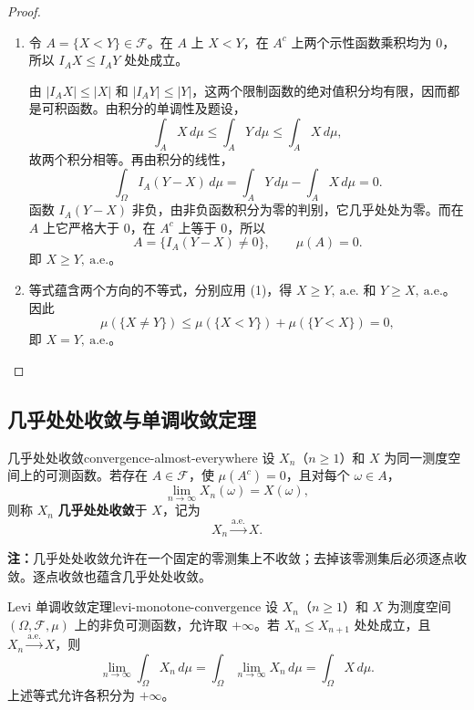 \begin{proof}
\begin{enumerate}
\item 令 $A=\{X<Y\}\in\mathcal F$。在 $A$ 上 $X<Y$，在 $A^c$ 上两个示性函数乘积均为 $0$，所以 $I_AX\leq I_AY$ 处处成立。

由 $|I_AX|\leq|X|$ 和 $|I_AY|\leq|Y|$，这两个限制函数的绝对值积分均有限，因而都是可积函数。由积分的单调性及题设，
\[
\int_A X\,d\mu\leq\int_A Y\,d\mu
\leq\int_A X\,d\mu,
\]
故两个积分相等。再由积分的线性，
\[
\int_\Omega I_A(Y-X)\,d\mu
=\int_A Y\,d\mu-\int_A X\,d\mu=0.
\]
函数 $I_A(Y-X)$ 非负，由非负函数积分为零的判别，它几乎处处为零。而在 $A$ 上它严格大于 $0$，在 $A^c$ 上等于 $0$，所以
\[
A=\{I_A(Y-X)\ne0\},\qquad\mu(A)=0.
\]
即 $X\geq Y,\ \mathrm{a.e.}$。
\item 等式蕴含两个方向的不等式，分别应用 (1)，得 $X\geq Y,\ \mathrm{a.e.}$ 和 $Y\geq X,\ \mathrm{a.e.}$。因此
\[
\mu(\{X\ne Y\})
\leq\mu(\{X<Y\})+\mu(\{Y<X\})=0,
\]
即 $X=Y,\ \mathrm{a.e.}$。
\end{enumerate}
\end{proof}

\subsection*{几乎处处收敛与单调收敛定理}

\begin{mydefinition}{几乎处处收敛}{convergence-almost-everywhere}
设 $X_n$（$n\geq1$）和 $X$ 为同一测度空间上的可测函数。若存在 $A\in\mathcal F$，使 $\mu(A^c)=0$，且对每个 $\omega\in A$，
\[
\lim_{n\to\infty}X_n(\omega)=X(\omega),
\]
则称 $X_n$ \textbf{几乎处处收敛}于 $X$，记为
\[
X_n\xrightarrow{\mathrm{a.e.}}X.
\]
\end{mydefinition}

\textbf{注：}\quad 几乎处处收敛允许在一个固定的零测集上不收敛；去掉该零测集后必须逐点收敛。逐点收敛也蕴含几乎处处收敛。

\begin{mytheorem}{Levi 单调收敛定理}{levi-monotone-convergence}
设 $X_n$（$n\geq1$）和 $X$ 为测度空间 $(\Omega,\mathcal F,\mu)$ 上的非负可测函数，允许取 $+\infty$。若 $X_n\leq X_{n+1}$ 处处成立，且 $X_n\xrightarrow{\mathrm{a.e.}}X$，则
\[
\lim_{n\to\infty}\int_\Omega X_n\,d\mu
=\int_\Omega\lim_{n\to\infty}X_n\,d\mu
=\int_\Omega X\,d\mu.
\]
上述等式允许各积分为 $+\infty$。
\end{mytheorem}

